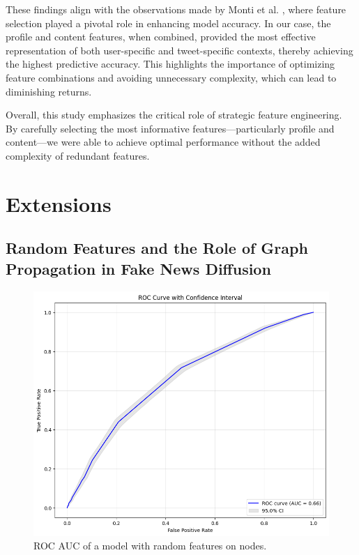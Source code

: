 \documentclass[sigconf,nonacm]{acmart}
\begin{document}
These findings align with the observations made by Monti et al. \cite{monti2019fakenewsdetectionsocial}, where feature selection played a pivotal role in enhancing model accuracy. In our case, the profile and content features, when combined, provided the most effective representation of both user-specific and tweet-specific contexts, thereby achieving the highest predictive accuracy. This highlights the importance of optimizing feature combinations and avoiding unnecessary complexity, which can lead to diminishing returns. 

Overall, this study emphasizes the critical role of strategic feature engineering. By carefully selecting the most informative features—particularly profile and content—we were able to achieve optimal performance without the added complexity of redundant features.

\section{Extensions}

\subsection{Random Features and the Role of Graph Propagation in Fake News Diffusion}

\begin{figure}
    \centering
    \includegraphics[scale=0.35]{roc_random.png}
    \caption{ROC AUC of a model with random features on nodes.}
    \label{fig:roc_random}
\end{figure}
\end{document}
